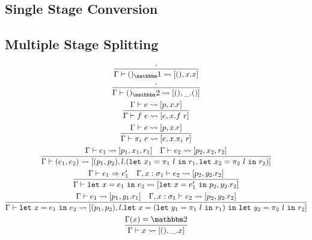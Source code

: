 \documentclass{article}
\newcommand {\bbone} {\mathbbm 1}
\newcommand {\bbtwo} {\mathbbm 2}
\newcommand {\letin} [3] {{\tt let}~{#1} = {#2}~{\tt in}~{#3}}
\newcommand {\splits} {\rightsquigarrow}
\begin{document}
\subsection {Single Stage Conversion}
\subsection {Multiple Stage Splitting}
\begin{gather}
\infer {\Gamma \vdash ()_\bbone \splits [(),x.x]}{\cdot} \\
\infer {\Gamma \vdash ()_\bbtwo \splits [(),\_.()]}{\cdot} \\
\infer {\Gamma \vdash f~e \splits [e,x.f~r]}{\Gamma \vdash e \splits [p,x.r]} \\
\infer {\Gamma \vdash \pi_i~e \splits [e,x.\pi_i~r]}{\Gamma \vdash e \splits [p,x.r]} \\
\infer {\Gamma \vdash (e_1,e_2) \splits [(p_1,p_2), l.(\letin{x_1}{\pi_1~l}{r_1},\letin{x_2}{\pi_2~l}{r_2})]}{\Gamma \vdash e_1 \splits [p_1,x_1,r_1] & \Gamma \vdash e_2 \splits [p_2,x_2,r_2]} \\
\infer {\Gamma\vdash \letin {x}{e_1}{e_2} \splits [\letin {x}{e'_1}{p_2}, y_2.r_2] }{\Gamma\vdash e_1 \Rightarrow e_1' & \Gamma, x:\sigma_1 \vdash e_2 \splits [p_2,y_2.r_2]} \\
\infer {\Gamma\vdash \letin {x}{e_1}{e_2} \splits [(p_1,p_2), l.\letin {x}{(\letin {y_1}{\pi_1~l}{r_1})}{\letin {y_2}{\pi_2~l}{r_2}}] }{\Gamma\vdash e_1 \splits [p_1,y_1.r_1] & \Gamma, x:\sigma_1 \vdash e_2 \splits [p_2,y_2.r_2]} \\
\infer {\Gamma\vdash x \splits [(),\_.x]}{\Gamma(x) = \bbtwo}
\end{gather}
\end{document}

